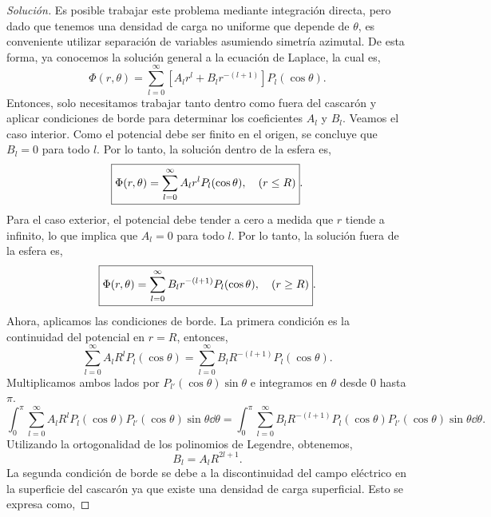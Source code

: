 \documentclass[11pt]{article}
\theoremstyle{definition}
\numberwithin{equation}{section}
\begin{document}
\begin{proof}[Solución]\renewcommand{\qedsymbol}{}
  Es posible trabajar este problema mediante integración directa, pero dado que tenemos una densidad de carga no uniforme que depende de $\theta$, es conveniente utilizar separación de variables asumiendo simetría azimutal. De esta forma, ya conocemos la solución general a la ecuación de Laplace, la cual es, 
  \begin{equation}
    \Phi(r,\theta) = \sum_{l=0}^{\infty}\left[A_l r^l + B_l r^{-(l+1)}\right]P_l(\cos\theta).
  \end{equation}
  Entonces, solo necesitamos trabajar tanto dentro como fuera del cascarón y aplicar condiciones de borde para determinar los coeficientes $A_l$ y $B_l$. 
  Veamos el caso interior. Como el potencial debe ser finito en el origen, se concluye que $B_l=0$ para todo $l$. Por lo tanto, la solución dentro de la esfera es,
  \begin{equation}
    \boxed{\Phi(r,\theta) = \sum_{l=0}^{\infty}A_l r^l P_l(\cos\theta) \qc (r\leq R)}.
  \end{equation}
  Para el caso exterior, el potencial debe tender a cero a medida que $r$ tiende a infinito, lo que implica que $A_l=0$ para todo $l$. Por lo tanto, la solución fuera de la esfera es,
  \begin{equation}
    \boxed{\Phi(r,\theta) = \sum_{l=0}^{\infty}B_l r^{-(l+1)} P_l(\cos\theta) \qc (r\geq R)}.
  \end{equation}
  Ahora, aplicamos las condiciones de borde. La primera condición es la continuidad del potencial en $r=R$, entonces,
  \begin{equation}
    \sum_{l=0}^{\infty}A_l R^l P_l(\cos\theta) = \sum_{l=0}^{\infty}B_l R^{-(l+1)} P_l(\cos\theta).
  \end{equation}
  Multiplicamos ambos lados por $P_{l'}(\cos\theta)\sin\theta$ e integramos en $\theta$ desde $0$ hasta $\pi$.
  \begin{equation}
    \int_0^{\pi}\sum_{l=0}^{\infty}A_l R^l P_l(\cos\theta)P_{l'}(\cos\theta)\sin\theta \dd{\theta} = \int_0^{\pi}\sum_{l=0}^{\infty}B_l R^{-(l+1)} P_l(\cos\theta)P_{l'}(\cos\theta)\sin\theta \dd{\theta}.
  \end{equation}
  Utilizando la ortogonalidad de los polinomios de Legendre, obtenemos,
  \begin{equation}
    \boxed{B_l = A_l R^{2l+1}}.
  \end{equation}
  La segunda condición de borde se debe a la discontinuidad del campo eléctrico en la superficie del cascarón ya que existe una densidad de carga superficial. Esto se expresa como,

\end{proof}
\end{document}
